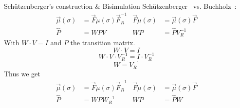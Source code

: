 \documentclass[rgb, pdf]{beamer}
\begin{document}
    \begin{frame}[allowframebreaks]{Schützenberger's construction \& Bisimulation}
       Schützenberger~\autocite{schutz} vs. Buchholz~\autocite{buchholz2008bisimulation}: 
        \begin{align}
         \overrightarrow{\mu}(\sigma) & = \overrightarrow{F} \mu(\sigma) \overrightarrow{F}^{-1}_R 
         & \overrightarrow{F} \mu(\sigma) & = \overrightarrow{\mu}(\sigma)\overrightarrow{F} \\
       \hat{P} & = W P V & W P & = \hat{P} V_R^{-1} 
        \end{align}   With $W \cdot V = I$ and $P$ the transition matrix. \\
        \vspace{0.7cm}
        \[ W \cdot V = I \]
        \[ W \cdot V \cdot V^{-1}_R = I \cdot V^{-1}_R \]
        \[ W = V^{-1}_R \]
        Thus we get 
        \begin{align}
         \overrightarrow{\mu}(\sigma) & = \overrightarrow{F} \mu(\sigma) \overrightarrow{F}^{-1}_R 
         & \overrightarrow{F} \mu(\sigma) & = \overrightarrow{\mu}(\sigma)\overrightarrow{F} \\
       \hat{P} & = W P W^{-1}_R & W P & = \hat{P} W
        \end{align}
        \end{frame}
        
\end{document}

